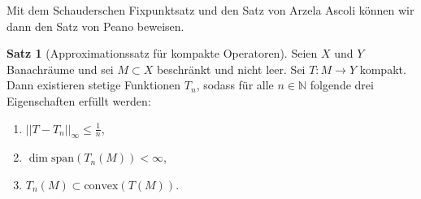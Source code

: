 \documentclass[a4paper]{article}
\theoremstyle{definition}
\newtheorem{theorem}{Satz}
\begin{document}
\vspace{1em}

Mit dem Schauderschen Fixpunktsatz und den Satz von Arzela Ascoli können wir dann den Satz von Peano beweisen.

\begin{theorem}[Approximationssatz für kompakte Operatoren]
Seien $X$ und $Y$ Banachräume und sei $M \subset X$ beschränkt und nicht leer. Sei $T: M \to Y$ kompakt. Dann existieren stetige Funktionen $T_n$, sodass für alle $n \in \mathbb{N}$ folgende drei Eigenschaften erfüllt werden:
\begin{enumerate}
    \item $||T - T_n||_{\infty} \leq \frac{1}{n}$,
    \item $\dim \mathrm{span}(T_n(M)) < \infty$,
    \item $T_n(M) \subset \mathrm{convex}(T(M))$.
\end{enumerate}
\end{theorem}
\end{document}
